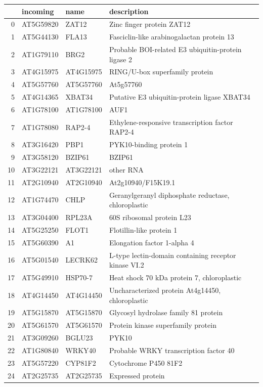 \documentclass[11pt]{article}
\begin{document}
\begin{center}
\begin{tabular}{rlll}
 & incoming & name & description\\
\hline
0 & AT5G59820 & ZAT12 & Zinc finger protein ZAT12\\
1 & AT5G44130 & FLA13 & Fasciclin-like arabinogalactan protein 13\\
2 & AT1G79110 & BRG2 & Probable BOI-related E3 ubiquitin-protein ligase 2\\
3 & AT4G15975 & AT4G15975 & RING/U-box superfamily protein\\
4 & AT5G57760 & AT5G57760 & At5g57760\\
5 & AT4G14365 & XBAT34 & Putative E3 ubiquitin-protein ligase XBAT34\\
6 & AT1G78100 & AT1G78100 & AUF1\\
7 & AT1G78080 & RAP2-4 & Ethylene-responsive transcription factor RAP2-4\\
8 & AT3G16420 & PBP1 & PYK10-binding protein 1\\
9 & AT3G58120 & BZIP61 & BZIP61\\
10 & AT3G22121 & AT3G22121 & other RNA\\
11 & AT2G10940 & AT2G10940 & At2g10940/F15K19.1\\
12 & AT1G74470 & CHLP & Geranylgeranyl diphosphate reductase, chloroplastic\\
13 & AT3G04400 & RPL23A & 60S ribosomal protein L23\\
14 & AT5G25250 & FLOT1 & Flotillin-like protein 1\\
15 & AT5G60390 & A1 & Elongation factor 1-alpha 4\\
16 & AT5G01540 & LECRK62 & L-type lectin-domain containing receptor kinase VI.2\\
17 & AT5G49910 & HSP70-7 & Heat shock 70 kDa protein 7, chloroplastic\\
18 & AT4G14450 & AT4G14450 & Uncharacterized protein At4g14450, chloroplastic\\
19 & AT5G15870 & AT5G15870 & Glycosyl hydrolase family 81 protein\\
20 & AT5G61570 & AT5G61570 & Protein kinase superfamily protein\\
21 & AT3G09260 & BGLU23 & PYK10\\
22 & AT1G80840 & WRKY40 & Probable WRKY transcription factor 40\\
23 & AT5G57220 & CYP81F2 & Cytochrome P450 81F2\\
24 & AT2G25735 & AT2G25735 & Expressed protein\\

\end{tabular}
\end{center}
\end{document}

